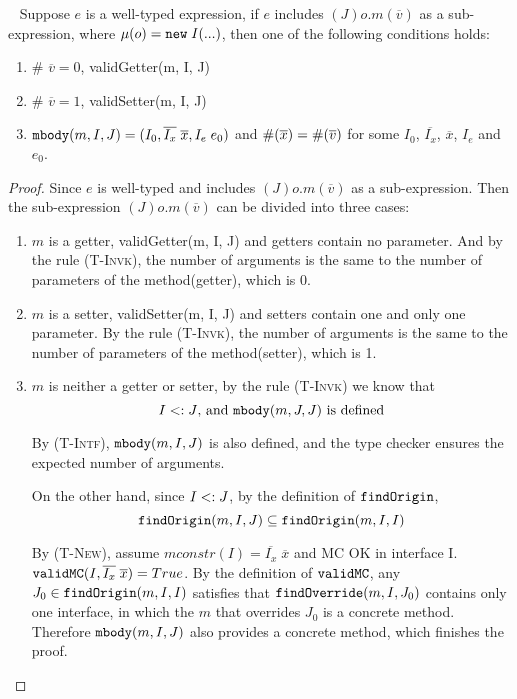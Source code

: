 \begin{theorem}[Progress]~\label{theorem_progress}
Suppose $e$ is a well-typed expression, if $e$ includes 
$(J)o.m(\overline{v})$ as a sub-expression, where $\mu(o) = \texttt{new} \; I(...)$, then one of the following conditions holds: 
\begin{enumerate}
	\item \# $\overline{v} = 0$, validGetter(m, I, J) 
	\item \# $\overline{v} = 1$, validSetter(m, I, J)
	\item $\texttt{mbody}(m, I, J) = (I_0, \overline{I_x} \; \overline{x}, I_e\; e_0)$ and $\#(\overline{x}) = \#(\overline{v})$ for some $I_0$, $\overline{I_x}$, $\overline{x}$, $I_e$ and $e_0$.
\end{enumerate}
\end{theorem}
\begin{proof} 
Since $e$ is well-typed and includes $(J)o.m(\overline{v})$ as a sub-expression. 
Then the sub-expression $(J)o.m(\overline{v})$ can be divided into three cases:
\begin{enumerate}
	\item $m$ is a getter, validGetter(m, I, J) and getters contain no parameter. And by the rule \textsc{(T-Invk)}, the number of arguments is the same to the number of parameters of the method(getter), which is 0. 
	\item $m$ is a setter, validSetter(m, I, J) and setters contain one and only one parameter. By the rule \textsc{(T-Invk)}, the number of arguments is the same to the number of parameters of the method(setter), which is 1. 
	\item $m$ is neither a getter or setter, by the rule \textsc{(T-Invk)} we know that
	$$I <: J\textrm{, and }\texttt{mbody}(m, J, J) \textrm{ is defined}$$

	By \textsc{(T-Intf)}, $\texttt{mbody}(m, I, J)$ is also defined, and the type checker ensures the expected number of arguments.

	On the other hand, since $I <: J$, by the definition of $\texttt{findOrigin}$, $$\texttt{findOrigin}(m, I, J) \subseteq \texttt{findOrigin}(m, I, I)$$

	By \textsc{(T-New)}, assume $mconstr(I) = \overline{I_x} \; \overline{x}$ and MC OK in interface I. $\texttt{validMC}(I, \overline{I_x} \; \overline{x}) = True$. By the definition of $\texttt{validMC}$, any $J_0\in\texttt{findOrigin}(m, I, I)$ satisfies that
	$\texttt{findOverride}(m, I, J_0)$ contains only one interface, in which the $m$ that overrides $J_0$ is a concrete method. Therefore $\texttt{mbody}(m, I, J)$ also provides a concrete method, which finishes the proof.
\end{enumerate}
\end{proof}

